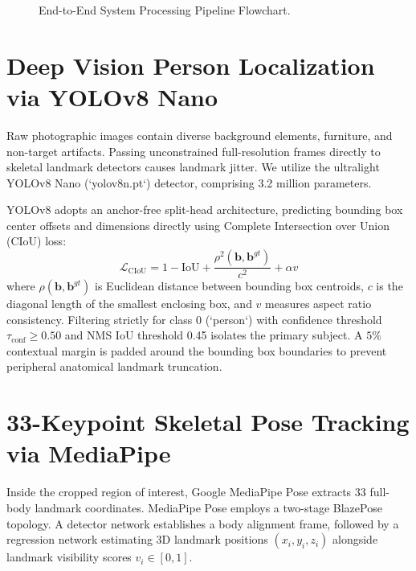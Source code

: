 \documentclass[12pt,a4paper,oneside]{report}
\begin{document}
\begin{figure}[H]
\caption{End-to-End System Processing Pipeline Flowchart.}
\label{fig:sys_arch_flowchart}
\end{figure}

\section{Deep Vision Person Localization via YOLOv8 Nano}
Raw photographic images contain diverse background elements, furniture, and non-target artifacts. Passing unconstrained full-resolution frames directly to skeletal landmark detectors causes landmark jitter. We utilize the ultralight YOLOv8 Nano (`yolov8n.pt`) detector, comprising 3.2 million parameters. 

YOLOv8 adopts an anchor-free split-head architecture, predicting bounding box center offsets and dimensions directly using Complete Intersection over Union (CIoU) loss:
\begin{equation}
\mathcal{L}_{\text{CIoU}} = 1 - \text{IoU} + \frac{\rho^2(\mathbf{b}, \mathbf{b}^{gt})}{c^2} + \alpha v
\end{equation}
where $\rho(\mathbf{b}, \mathbf{b}^{gt})$ is Euclidean distance between bounding box centroids, $c$ is the diagonal length of the smallest enclosing box, and $v$ measures aspect ratio consistency. Filtering strictly for class 0 (`person`) with confidence threshold $\tau_{\text{conf}} \ge 0.50$ and NMS IoU threshold 0.45 isolates the primary subject. A $5\%$ contextual margin is padded around the bounding box boundaries to prevent peripheral anatomical landmark truncation.

\section{33-Keypoint Skeletal Pose Tracking via MediaPipe}
Inside the cropped region of interest, Google MediaPipe Pose extracts 33 full-body landmark coordinates. MediaPipe Pose employs a two-stage BlazePose topology. A detector network establishes a body alignment frame, followed by a regression network estimating 3D landmark positions $(x_i, y_i, z_i)$ alongside landmark visibility scores $v_i \in [0, 1]$.
\end{document}
